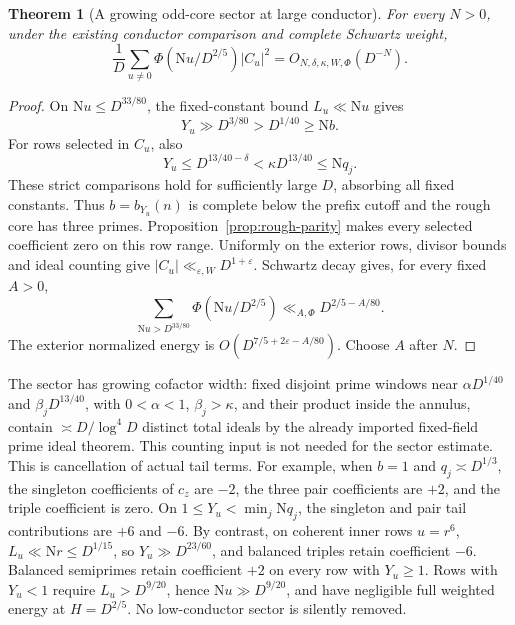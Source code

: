 \documentclass[11pt]{article}
\numberwithin{equation}{section}
\newtheorem{theorem}{Theorem}[section]
\theoremstyle{definition}
\theoremstyle{remark}
\newcommand{\N}{\mathrm N}
\newcommand{\eps}{\varepsilon}
\begin{document}
\begin{theorem}[A growing odd-core sector at large conductor]
\label{thm:rough-sector}
For every \(N>0\), under the existing conductor comparison and complete
Schwartz weight,
\begin{equation}\label{eq:rough-sector-energy}
 \frac1D\sum_{u\ne0}\Phi(\N u/D^{2/5})|C_u|^2
       =O_{N,\delta,\kappa,W,\Phi}(D^{-N}).
\end{equation}
\end{theorem}
\begin{proof}
On \(\N u\le D^{33/80}\), the fixed-constant bound \(L_u\ll\N u\)
gives
\[
 Y_u\gg D^{3/80}>D^{1/40}\ge\N b.
\]
For rows selected in \(C_u\), also
\[
 Y_u\le D^{13/40-\delta}<\kappa D^{13/40}\le\N q_j.
\]
These strict comparisons hold for sufficiently large \(D\), absorbing
all fixed constants. Thus \(b=b_{Y_u}(n)\) is complete below the
prefix cutoff and the rough core has three primes.
Proposition~\ref{prop:rough-parity} makes every selected coefficient
zero on this row range. Uniformly on the exterior rows, divisor bounds
and ideal counting give \(|C_u|\ll_{\eps,W}D^{1+\eps}\). Schwartz
decay gives, for every fixed \(A>0\),
\[
 \sum_{\N u>D^{33/80}}\Phi(\N u/D^{2/5})
     \ll_{A,\Phi}D^{2/5-A/80}.
\]
The exterior normalized energy is
\(O(D^{7/5+2\eps-A/80})\). Choose \(A\) after \(N\).
\end{proof}

The sector has growing cofactor width: fixed disjoint prime windows
near \(\alpha D^{1/40}\) and \(\beta_jD^{13/40}\), with
\(0<\alpha<1\), \(\beta_j>\kappa\), and their product inside the
annulus, contain \(\asymp D/\log^4D\) distinct total ideals by the
already imported fixed-field prime ideal theorem. This counting input
is not needed for the sector estimate.
This is cancellation of actual tail terms. For example, when \(b=1\)
and \(q_j\asymp D^{1/3}\), the singleton coefficients of \(c_z\)
are \(-2\), the three pair coefficients are \(+2\), and the triple
coefficient is zero. On \(1\le Y_u<\min_j\N q_j\), the singleton
and pair tail contributions are \(+6\) and \(-6\).
By contrast, on coherent inner rows \(u=r^6\),
\(L_u\ll\N r\le D^{1/15}\), so \(Y_u\gg D^{23/60}\), and
balanced triples retain coefficient \(-6\). Balanced semiprimes retain
coefficient \(+2\) on every row with \(Y_u\ge1\).
Rows with \(Y_u<1\) require \(L_u>D^{9/20}\), hence
\(\N u\gg D^{9/20}\), and have negligible full weighted energy at
\(H=D^{2/5}\). No low-conductor sector is silently removed.
\end{document}
